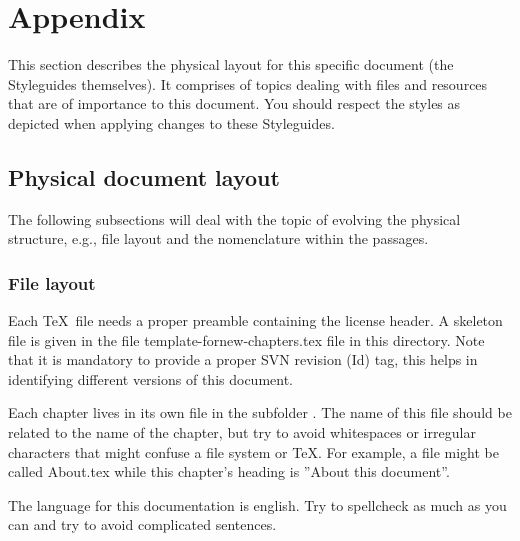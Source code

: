 


\section{Appendix}
This section describes the physical layout for this specific document (the Styleguides themselves).
It comprises of topics dealing with files and resources that are of importance to this document.
You should respect the styles as depicted when applying changes to these Styleguides.

\subsection{Physical document layout}

The following subsections will deal with the topic of evolving the physical structure, e.g., file layout and the nomenclature within the passages.

\subsubsection{File layout}
Each \TeX\ file needs a proper preamble containing the license header.
A skeleton file is given in the file {\ttfamily template-for\-new-chapters.tex} file in this directory.
Note that it is mandatory to provide a proper SVN revision (Id) tag, this helps in identifying different versions of this document.

Each chapter lives in its own file in the subfolder .
The name of this file should be related to the name of the chapter, but try to avoid whitespaces or irregular characters that might confuse a file system or \TeX.
For example, a file might be called {\ttfamily About.tex} while this chapter's heading is ''About this document''.

The language for this documentation is english.
Try to spellcheck as much as you can and try to avoid complicated sentences.

